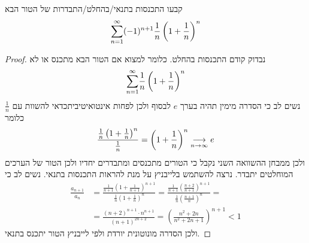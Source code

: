\documentclass{article}
\begin{document}
\begin{exercise}
קבעו התכנסות בתנאי/בהחלט/התבדרות של הטור הבא
\[\overset{\infty}{\underset{n=1}{\sum}} (-1)^{n+1}\frac{1}{n}\left(1+\frac{1}{n}\right)^n\]
\end{exercise}

\begin{proof}
נבדוק קודם התכנסות בהחלט. כלומר למצוא אם הטור הבא מתכנס או לא
\[\overset{\infty}{\underset{n=1}{\sum}} \frac{1}{n}\left(1+\frac{1}{n}\right)^n\]
נשים לב כי הסדרה מימין תהיה בערך 
$e$
לבסוף ולכן לפחות אינטואיטיביתכדאי להשוות עם 
$\frac{1}{n}$
כלומר 
\[\frac{\frac{1}{n}\left(1+\frac{1}{n}\right)^n}{\frac{1}{n}}=\left(1+\frac{1}{n}\right)^n\underset{n\rightarrow\infty}{\longrightarrow} e\]
ולכן ממבחן ההשוואה השני נקבל כי הטורים מתכנסים ומתבדרים יחדיו ולכן הטור של הערכים המוחלטים יתבדר. נרצה להשתמש בלייבניץ על מנת להראות התכנסות בתנאי. נשים לב כי
\begin{align*}
\frac{a_{n+1}}{a_n} &= \frac{\frac{1}{n+1}\left(1+\frac{1}{n+1}\right)^{n+1}}{\frac{1}{n}\left(1+\frac{1}{n}\right)^n} = \frac{\frac{1}{n+1}\left(\frac{n+2}{n+1}\right)^{n+1}}{\frac{1}{n}\left(\frac{n+1}{n}\right)^n} = \\ &= \frac{(n+2)^{n+1}\cdot n^{n+1}}{(n+1)^{2n+2}} = \left(\frac{n^2+2n}{n^2+2n+1}\right)^{n+1}<1
\end{align*}
ולכן הסדרה מונוטונית יורדת ולפי לייבניץ הטור יתכנס בתנאי.
\end{proof}
\end{document}
